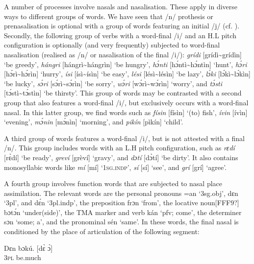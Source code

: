 A number of processes involve nasals and nasalisation. These apply in diverse ways to different groups of words. We have seen that /n/ prothesis or prenasalisation is optional with a group of words featuring an initial /j/ (cf. ). Secondly, the following group of verbs with a word-final /i/ and an H.L pitch configuration is optionally (and very frequently) subjected to word-final nasalisation (realised as /n/ or nasalisation of the final /i/): \textit{grídi} [grídì{\textasciitilde}grídìn] ‘be greedy’, \textit{hángri} [hángrì{\textasciitilde}hángrìn] ‘be hungry’, \textit{hɔ́nti} [hɔ́ntì{\textasciitilde}hɔ́ntìn] ‘hunt’, \textit{hɔ́ri} [hɔ́rì{\textasciitilde}hɔ́rìn] ‘hurry’, \textit{ísi} [ísì{\textasciitilde}ísìn] ‘be easy’, \textit{lési} [lésì{\textasciitilde}lésìn] ‘be lazy’, \textit{lɔ́ki} [lɔ́kì{\textasciitilde}lɔ́kìn] ‘be lucky’, \textit{sɔ́ri} [sɔ́rì{\textasciitilde}sɔ́rìn] ‘be sorry’, \textit{wɔ́ri} [wɔ́rì{\textasciitilde}wɔ́rìn] ‘worry’, and \textit{tɔ́sti} [tɔ́stì{\textasciitilde}tɔ́stìn] ‘be thirsty’. This group of words may be contrasted with a second group that also features a word-final /i/, but exclusively occurs with a word-final nasal. In this latter group, we find words such as \textit{físin} [físìn] ‘(to) fish’, \textit{ívin} [ívìn] ‘evening’, \textit{mɔ́nin} [mɔ́nìn] ‘morning’, and \textit{pikín} [pìkín] ‘child’. 


A third group of words features a word-final /i/, but is not attested with a final /n/. This group includes words with an L.H pitch configuration, such as \textit{rɛdí} [rɛ̀dí] ‘be ready’, \textit{greví} [grèví] ‘gravy’, and \textit{dɔtí} [dɔ̀tí] ‘be dirty’. It also contains monosyllabic words like \textit{mí} [mí] ‘\textsc{1sg.indp}’, \textit{sí} [sí] ‘see’, and \textit{grí} [grí] ‘agree’. 



A fourth group involves function words that are subjected to nasal place assimilation. The relevant words are the personal pronouns =an ‘3sg.obj’, dɛn ‘3pl’, and dɛ́n ‘3pl.indp’, the preposition frɔn ‘from’, the locative noun[FFF9?] bɔtɔ́n ‘under(side)’, the TMA marker and verb kán ‘pfv; come’, the determiner sɔn ‘some; a’, and the pronominal sén ‘same’. In these words, the final nasal is conditioned by the place of articulation of the following segment:



\ea%
    \label{ex:key:27}
    \gll   Dɛn    bɔkú.            [dɛ̀  ɔ̀]\\
\textsc{3pl}    be.much\\

